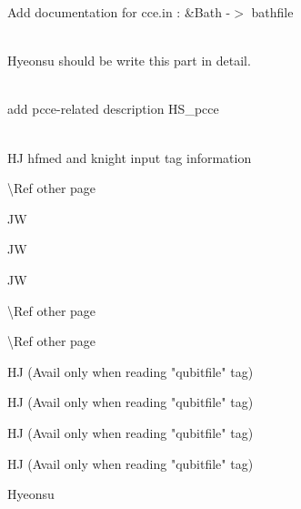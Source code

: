 \begin{DoxyRefList}
\label{todo__todo000004}%
%
Add documentation for cce.\+in \+: \&Bath -\/\texorpdfstring{$>$}{>} bathfile  
\item[Member \doxylink{structCluster_a7c4d583750b7f37eb2ca537e23ad334f}{Cluster\+::sK} ]\hfill \\
\label{todo__todo000013}%
%
Hyeonsu should be write this part in detail.  
\item[Member \doxylink{structConfig_a73d927bf5bdb0f39d024b23dc66f0c1c}{Config\+::method} \mbox{[}MAX\+\_\+\+CHARARRAY\+\_\+\+LENGTH\mbox{]}]\hfill \\
\label{todo__todo000014}%
%
add pcce-\/related description HS\+\_\+pcce  
\item[Page \doxylink{InputFile}{Input File} ]\hfill \\
\label{todo__todo000025}%
%
HJ hfmed and knight input tag information

\label{todo__todo000026}%
%
\textbackslash{}Ref other page 

\label{todo__todo000027}%
%
JW 

\label{todo__todo000028}%
%
JW 

\label{todo__todo000029}%
%
JW 

\label{todo__todo000030}%
%
\textbackslash{}Ref other page 

\label{todo__todo000031}%
%
\textbackslash{}Ref other page 

\label{todo__todo000032}%
%
HJ (Avail only when reading "{}qubitfile"{} tag) 

\label{todo__todo000033}%
%
HJ (Avail only when reading "{}qubitfile"{} tag) 



\label{todo__todo000034}%
%
HJ (Avail only when reading "{}qubitfile"{} tag) 



\label{todo__todo000035}%
%
HJ (Avail only when reading "{}qubitfile"{} tag) 



\label{todo__todo000036}%
%
Hyeonsu 


\end{DoxyRefList}
